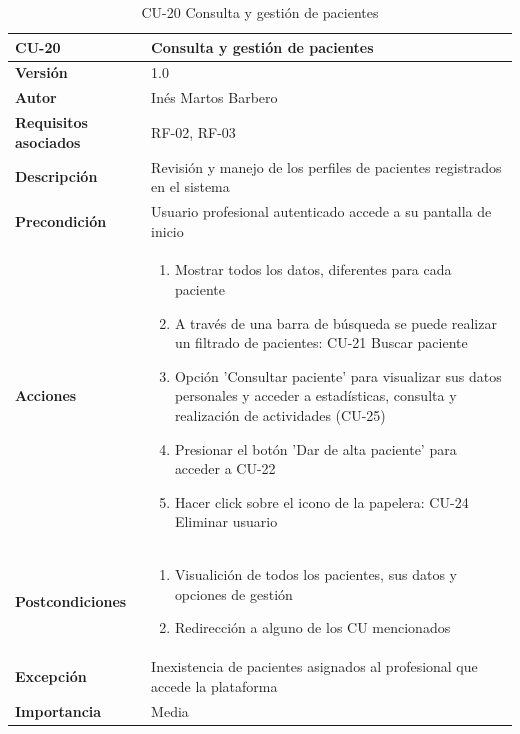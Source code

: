 \begin{table}[p]
	\centering
	\begin{tabularx}{\linewidth}{ p{} p{} }
		\toprule
		\textbf{CU-20}    & \textbf{Consulta y gestión de pacientes}\\
		\toprule
		\textbf{Versión}              & 1.0    \\
		\textbf{Autor}                & Inés Martos Barbero \\
		\textbf{Requisitos asociados} & RF-02, RF-03 \\
		\textbf{Descripción}          & Revisión y manejo de los perfiles de pacientes registrados en el sistema \\
		\textbf{Precondición}         & Usuario profesional autenticado accede a su pantalla de inicio \\
		\textbf{Acciones}             &
		\begin{enumerate}
			\def\labelenumi{\arabic{enumi}.}
			\tightlist
			\item Mostrar todos los datos, diferentes para cada paciente
			\item A través de una barra de búsqueda se puede realizar un filtrado de pacientes: CU-21 Buscar paciente
            \item Opción 'Consultar paciente' para visualizar sus datos personales y acceder a estadísticas, consulta y realización de actividades (CU-25)
            \item Presionar el botón 'Dar de alta paciente' para acceder a CU-22
            \item Hacer click sobre el icono de la papelera: CU-24 Eliminar usuario
		\end{enumerate}\\
		\textbf{Postcondiciones}        & 
        \begin{enumerate}
			\def\labelenumi{\arabic{enumi}.}
			\tightlist
			\item Visualición de todos los pacientes, sus datos y opciones de gestión
			\item Redirección a alguno de los CU mencionados
		\end{enumerate}\\
		\textbf{Excepción}          & Inexistencia de pacientes asignados al profesional que accede la plataforma \\
		\textbf{Importancia}          & Media \\
		\bottomrule
	\end{tabularx}
	\caption{CU-20 Consulta y gestión de pacientes}
    \label{CU-20}
\end{table}

